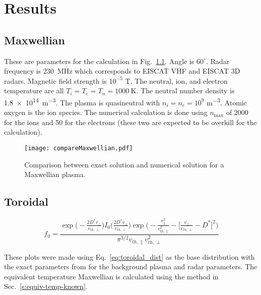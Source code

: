\chapter{Results}

\section{Maxwellian}

These are parameters for the calculation in Fig.~\ref{f:compareMaxwellian}.
Angle is $60^\circ$. 
Radar frequency is \SI{230}{\mega\hertz} which corresponds to EISCAT VHF and EISCAT 3D radars.  %
Magnetic field strength is $10^{-5}$ \si{\tesla}.
The neutral, ion, and electron temperature are all $T_i=T_e=T_n=\SI{1000}{\kelvin}$.
The neutral number density is \SI{1.8e14}{\meter^{-3}}.
The plasma is quasineutral with $n_i=n_e=10^9$ \si{\meter^{-3}}.
Atomic oxygen is the ion species.
The numerical calculation is done using $n_{\max}$ of 2000 for the ions and 50 for the electrons (these two are expected to be overkill for the calculation).

\begin{figure}[!htb]
	\texttt{[image: compareMaxwellian.pdf]}
	\caption{Comparison between exact solution and numerical solution for a Maxwellian plasma.}
	\label{f:compareMaxwellian}
\end{figure}


\section{Toroidal}

\begin{equation}
	f_0 = \frac{
		\exp\bigg( - \frac{2 D^* v_\perp}{v_{th,\perp}} \bigg) I_0 \bigg(  \frac{2 D^* v_\perp}{v_{th,\perp}} \bigg)  
		\exp \bigg(  -\frac{v_\parallel^2}{v_{th,\parallel}^2} - \Big[ \frac{v_\perp}{v_{th,\perp} } - D^* \Big]^2  \bigg)}{
		\pi^{3/2} v_{th,\parallel} v_{th,\perp}^{2}}
	\label{eq:toroidal_dist}
\end{equation}

These plots were made using Eq.~\ref{eq:toroidal_dist} as the base distribution with the exact parameters from \cite{goodwin2018} for the background plasma and radar parameters.
The equivalent temperature Maxwellian is calculated using the method in Sec.~\ref{s:equiv-temp-known}.

